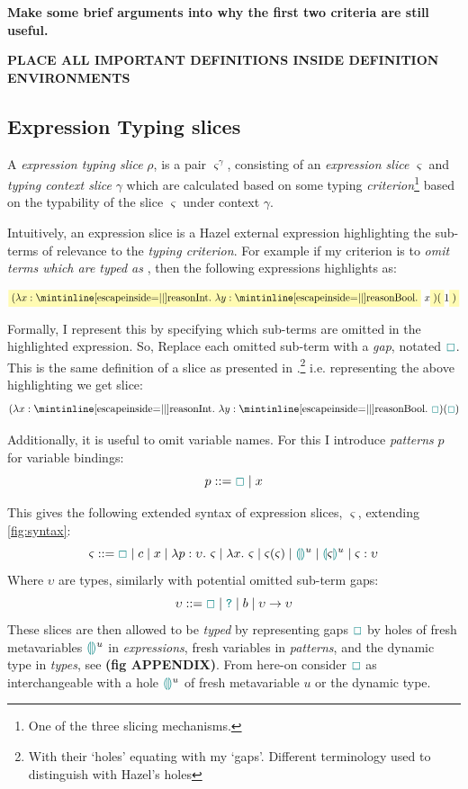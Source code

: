 \textbf{Make some brief arguments into why the first two criteria are still useful.}

\textbf{PLACE ALL IMPORTANT DEFINITIONS INSIDE DEFINITION ENVIRONMENTS}

\subsection{Expression Typing slices}\label{sec:ExpressionTypingSlices}
A \textit{expression typing slice} $\rho$, is a pair $\varsigma^\gamma$, consisting of an \textit{expression slice} $\varsigma$ and \textit{typing context slice} $\gamma$ which are calculated based on some typing \textit{criterion}\footnote{One of the three slicing mechanisms.} based on the typability of the slice $\varsigma$ under context $\gamma$. 

Intuitively, an expression slice is a Hazel external expression highlighting the sub-terms of relevance to the \textit{typing criterion}. For example if my criterion is to \textit{omit terms which are typed as} , then the following expressions highlights as:

\[\hlcmaths[yellow!30]{(\lambda x: \code{Int}.\ \lambda y : \code{Bool}.}\ x\hlcmaths[yellow!30]{)(}1\hlcmaths[yellow!30]{)}\]

Formally, I represent this by specifying which sub-terms are omitted in the highlighted expression. So, Replace each omitted sub-term with a \textit{gap}, notated $\gap$. This is the same definition of a slice as presented in \cite{FunctionalProgExplain}.\footnote{With their `holes' equating with my `gaps'. Different terminology used to distinguish with Hazel's holes} i.e. representing the above highlighting we get slice:
\[(\lambda x : \code{Int}.\ \lambda y : \code{Bool}.\ \gap)(\gap)\]


Additionally, it is useful to omit variable names. For this I introduce \textit{patterns} $p$ for variable bindings: 
\[p ::= \gap \mid x\]

This gives the following extended syntax of expression slices, $\varsigma$, extending \cref{fig:syntax}:
\[\varsigma ::= \gap \mid  c \mid x \mid \lambda p : \upsilon.\ \varsigma \mid \lambda x.\ \varsigma \mid \varsigma(\varsigma) \mid \hole^u \mid \hole[\varsigma]^u \mid \varsigma : \upsilon\]
Where $\upsilon$ are types, similarly with potential omitted sub-term gaps:
\[\upsilon ::= \gap \mid \dyn \mid b \mid \upsilon \to \upsilon\]
These slices are then allowed to be \textit{typed} by representing gaps $\gap$ by holes of fresh metavariables $\hole^u$ in \textit{expressions}, fresh variables in \textit{patterns}, and the dynamic type in \textit{types}, see \textbf{(fig APPENDIX)}. From here-on consider $\gap$ as interchangeable with a hole $\hole^u$ of fresh metavariable $u$ or the dynamic type.

